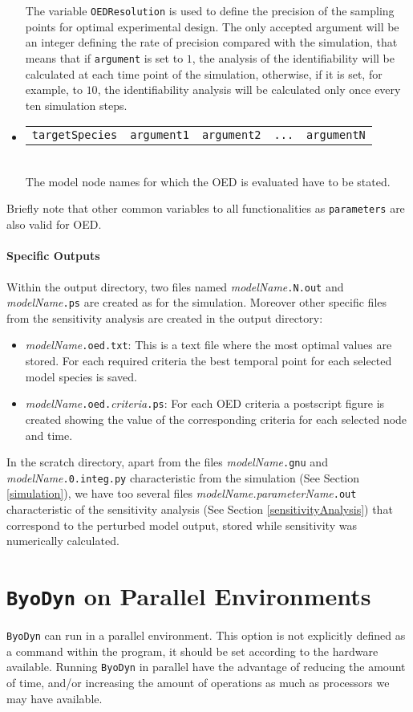 \documentclass[a4paper, 11pt]{article}
\begin{document}
\begin{itemize}
      The variable \texttt{OEDResolution} is used to define the precision of the sampling points for optimal experimental design. 
      The only accepted argument will be an integer defining the rate of precision compared with the simulation, that means that if \texttt{argument} is set to $1$, the analysis of the identifiability will be calculated at each time point of the simulation, otherwise, if it is set, for example, to $10$, the identifiability analysis will be calculated only once every ten simulation steps.
    \item \begin{tabular}{ccccc}\texttt{targetSpecies}&\texttt{argument1}&\texttt{argument2}&\texttt{...}&\texttt{argumentN}\end{tabular}\\[1.5ex]
      The model node names for which the OED is evaluated have to be stated.
\end{itemize}
Briefly note that other common variables to all functionalities as \texttt{parameters} are also valid for OED.
\paragraph{Specific Outputs}
Within the output directory, two files named \textit{modelName}\texttt{.N.out} and \textit{modelName}\texttt{.ps} are created as for the simulation.
Moreover other specific files from the sensitivity analysis are created in the output directory:
\begin{itemize}
  \item \textit{modelName}\texttt{.oed.txt}:
    This is a text file where the most optimal values are stored.
    For each required criteria the best temporal point for each selected model species is saved.
  \item \textit{modelName}\texttt{.oed.}\textit{criteria}\texttt{.ps}:
    For each OED criteria a postscript figure is created showing the value of the corresponding criteria for each selected node and time.
\end{itemize}
In the scratch directory, apart from the files \textit{modelName}\texttt{.gnu} and \textit{modelName}\texttt{.0.integ.py} characteristic from the simulation (See Section \ref{simulation}), we have too several files \textit{modelName.parameterName}\texttt{.out} characteristic of the sensitivity analysis (See Section \ref{sensitivityAnalysis}) that correspond to the perturbed model output, stored while sensitivity was numerically calculated.
\section{\texttt{ByoDyn} on Parallel Environments}
\texttt{ByoDyn} can run in a parallel environment.
This option is not explicitly defined as a command within the program, it should be set according to the hardware available. 
Running \texttt{ByoDyn} in parallel have the advantage of reducing the amount of time, and/or increasing the amount of operations as much as processors we may have available. 
\end{document}
